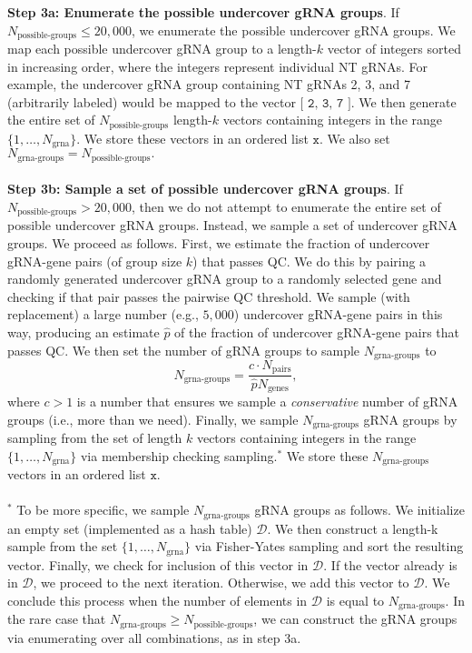 \documentclass[12pt]{article}
\begin{document}
\textbf{Step 3a: Enumerate the possible undercover gRNA groups}. If $N_\textrm{possible-groups} \leq 20,000$, we enumerate the possible undercover gRNA groups. We map each possible undercover gRNA group to a length-$k$ vector of integers sorted in increasing order, where the integers represent individual NT gRNAs. For example, the undercover gRNA group containing NT gRNAs 2, 3, and 7 (arbitrarily labeled) would be mapped to the vector $\texttt{[ 2, 3, 7 ]}.$ We then generate the entire set of $N_\textrm{possible-groups}$ length-$k$ vectors containing integers in the range $\{1, \dots, N_\textrm{grna}\}$. We store these vectors in an ordered list $\texttt{x}$. We also set $N_\textrm{grna-groups} = N_\textrm{possible-groups}.$
\\ \\
\textbf{Step 3b: Sample a set of possible undercover gRNA groups}. If $N_\textrm{possible-groups} > 20,000$, then we do not attempt to enumerate the entire set of possible undercover gRNA groups. Instead, we sample a set of undercover gRNA groups. We proceed as follows. First, we estimate the fraction of undercover gRNA-gene pairs (of group size $k$) that passes QC. We do this by pairing a randomly generated undercover gRNA group to a randomly selected gene and checking if that pair passes the pairwise QC threshold. We sample (with replacement) a large number (e.g., $5,000$) undercover gRNA-gene pairs in this way, producing an estimate $\hat{p}$ of the fraction of undercover gRNA-gene pairs that passes QC. We then set the number of gRNA groups to sample $N_\textrm{grna-groups}$ to $$N_\textrm{grna-groups} = \frac{c \cdot N_\textrm{pairs} }{ \hat{p} N_\textrm{genes}},$$ where $c > 1$ is a number that ensures we sample a \textit{conservative} number of gRNA groups (i.e., more than we need). Finally, we sample $N_\textrm{grna-groups}$ gRNA groups by sampling from the set of length $k$ vectors containing integers in the range $\{1, \dots, N_\textrm{grna}\}$ via membership checking sampling.$^*$ We store these $N_\textrm{grna-groups}$ vectors in an ordered list $\texttt{x}$.
\\ \\
$^*$ To be more specific, we sample $N_\textrm{grna-groups}$ gRNA groups as follows. We initialize an empty set (implemented as a hash table) $\mathcal{D}$. We then construct a length-k sample from the set $\{1, \dots, N_\textrm{grna}\}$ via Fisher-Yates sampling and sort the resulting vector. Finally, we check for inclusion of this vector in $\mathcal{D}.$ If the vector already is in $\mathcal{D}$, we proceed to the next iteration. Otherwise, we add this vector to $\mathcal{D}$. We conclude this process when the number of elements in $\mathcal{D}$ is equal to $N_\textrm{grna-groups}.$ In the rare case that $N_\textrm{grna-groups} \geq N_\textrm{possible-groups}$, we can construct the gRNA groups via enumerating over all combinations, as in step 3a. 
\end{document}
